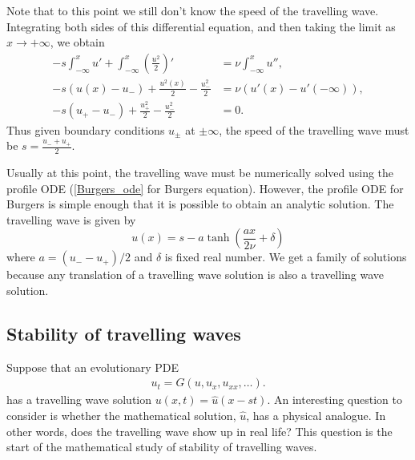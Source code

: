 Note that to this point we still don't know the speed of the travelling wave.
Integrating both sides of this differential equation, and then taking the limit as $x \to +\infty$, we obtain
\begin{align*}
-s\int_{-\infty}^x u' + \int_{-\infty}^x \left(\frac{u^2}{2}\right)' &= \nu \int_{-\infty}^x u'',\\
-s(u(x) - u_-) + \frac{u^2(x)}{2} - \frac{u_-^2}{2} &= \nu (u'(x) - u'(-\infty)), \\
-s(u_+ - u_-) + \frac{u_+^2}{2} - \frac{u_-^2}{2} &= 0.
\end{align*}
Thus given boundary conditions $u_{\pm}$ at $\pm \infty$, the speed of the travelling wave must be $s = \frac{u_- + u_+}{2}$.

Usually at this point, the travelling wave must be numerically solved using the profile ODE (\eqref{Burgers_ode} for Burgers equation).
However, the profile ODE for Burgers is simple enough that it is possible to obtain an analytic solution.
The travelling wave is  given by 
\[u(x) = s - a \tanh \left(\frac{ax }{2\nu} + \delta\right)\]
where $a = (u_- - u_+)/2$ and $\delta$ is fixed real number.
We get a family of solutions because any translation of a travelling wave solution is also a travelling wave solution.

\subsection*{Stability of travelling waves}
Suppose that an evolutionary PDE
\begin{align}
u_t = G(u,u_x, u_{xx}, \ldots). \label{evol_pde_repeat}
\end{align}
has a travelling wave solution $u(x,t) = \hat{u}(x-st)$.  An interesting question to consider is whether the mathematical solution, $\hat{u}$, has a physical analogue.
In other words, does the travelling wave show up in real life?
This question is the start of the mathematical study of stability of travelling waves.

